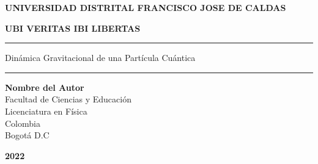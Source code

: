 \begin{titlepage}
\begin{center}
{\LARGE \textbf{UNIVERSIDAD DISTRITAL FRANCISCO JOSE DE CALDAS}}\\

\vspace{2mm}

{\large \textbf{UBI VERITAS IBI LIBERTAS}}\\


\rule{150mm}{0.5mm}
\vspace{2mm}
\begin{spacing}{2}
	{\Large Dinámica Gravitacional de una Partícula Cuántica }
\end{spacing}
\vspace{2mm}
\rule{150mm}{0.5mm}


\vspace{2cm}
{\Large \textbf{Nombre del Autor}}\\
\vspace{5mm}
{\large Facultad de Ciencias y Educación}\\
\vspace{5mm}
{\Large Licenciatura en Física}\\
\vspace{5mm}
{\Large Colombia}\\
\vspace{5mm}
{\Large Bogotá D.C}

\vfil
{\Huge \textbf{2022}}

\end{center}
\end{titlepage}
